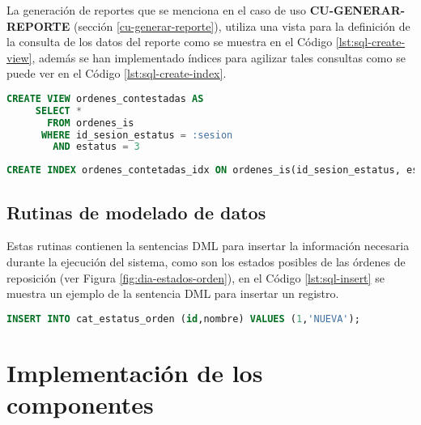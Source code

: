 La generación de reportes que se menciona en el caso de uso \textbf{CU-GENERAR-REPORTE} (sección \ref{cu-generar-reporte}), utiliza una vista para la definición de la consulta de los datos del reporte como se muestra en el Código \ref{lst:sql-create-view}, además se han implementado índices para agilizar tales consultas como se puede ver en el Código \ref{lst:sql-create-index}.

\begin{lstlisting}[language=SQL, caption={Sentencia para crear una vista.}, captionpos=b, label={lst:sql-create-view}]
CREATE VIEW ordenes_contestadas AS
     SELECT *
       FROM ordenes_is
      WHERE id_sesion_estatus = :sesion
        AND estatus = 3
\end{lstlisting}

\begin{lstlisting}[language=SQL, caption={Sentencia para crear un índice.}, captionpos=b, label={lst:sql-create-index}]
CREATE INDEX ordenes_contetadas_idx ON ordenes_is(id_sesion_estatus, estatus);
\end{lstlisting}

\subsection{Rutinas de modelado de datos}
Estas rutinas contienen la sentencias DML para insertar la información necesaria durante la ejecución del sistema, como son los estados posibles de las órdenes de reposición (ver Figura \ref{fig:dia-estados-orden}), en el Código \ref{lst:sql-insert} se muestra un ejemplo de la sentencia DML para insertar un registro.

\begin{lstlisting}[language=SQL, caption={Sentencia insertar un registro.}, captionpos=b, label={lst:sql-insert}]
INSERT INTO cat_estatus_orden (id,nombre) VALUES (1,'NUEVA');
\end{lstlisting}

%

\section{Implementación de los componentes}







